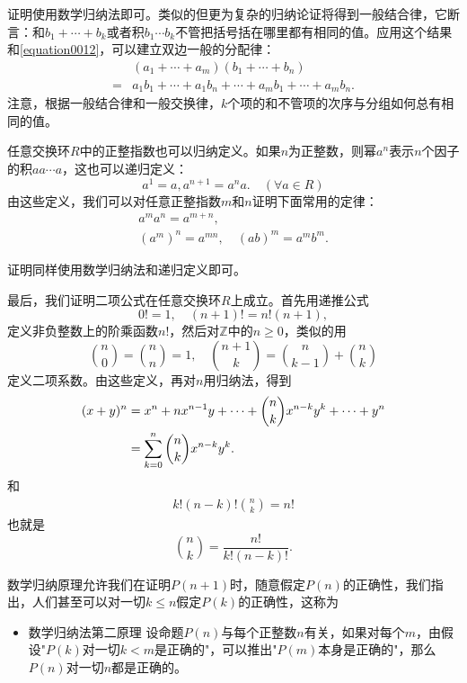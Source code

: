证明使用数学归纳法即可。类似的但更为复杂的归纳论证将得到一般结合律，它断言：和$b_1+\cdots+b_k$或者积$b_1\cdots{}b_k$不管把括号括在哪里都有相同的值。应用这个结果和\ref{equation0012}，可以建立双边一般的分配律：
\[
\begin{aligned}
&(a_1+\cdots+a_m)(b_1+\cdots+b_n)\\
=&a_1b_1+\cdots+a_1b_n+\cdots+a_mb_1+\cdots+a_mb_n.
\end{aligned}
\]
注意，根据一般结合律和一般交换律，$k$个项的和不管项的次序与分组如何总有相同的值。

任意交换环$R$中的正整指数也可以归纳定义。如果$n$为正整数，则幂$a^n$表示$n$个因子的积$aa\cdots{}a$，这也可以递归定义：
\begin{equation}\label{equation0016}
a^1 = a, a^{n+1} = a^na. \quad(\forall a \in R)
\end{equation}由这些定义，我们可以对任意正整指数$m$和$n$证明下面常用的定律：
\begin{gather}
a^ma^n=a^{m+n},\label{equation0017}\\
(a^m)^n = a^{mn},\quad (ab)^m=a^mb^m.\label{equation0018}
\end{gather}

证明同样使用数学归纳法和递归定义即可。

最后，我们证明二项公式在任意交换环$R$上成立。首先用递推公式
\[
0!=1,\quad (n+1)!=n!(n+1),
\]
定义非负整数上的阶乘函数$n!$，然后对$\mathbb{Z}$中的$n \ge 0$，类似的用
\[
\binom{n}{0} = \binom{n}{n}=1, \quad \binom{n+1}{k} = \binom{n}{k-1} + \binom{n}{k} 
\]
定义二项系数。由这些定义，再对$n$用归纳法，得到 %
\begin{align}\label{equation0019}
(x+y)^n &= x^n + nx^{n-1}y + \cdots + \binom{n}{k}x^{n-k}y^k + \cdots + y^n \notag \\
&=\sum_{k=0}^{n}{\binom{n}{k}x^{n-k}y^k}.
\end{align}
和
\begin{gather}\label{equation0020}
k!(n-k)!\binom{n}{k}=n!
\end{gather}
也就是
\[
{n \choose k} = \frac{n!}{k!(n-k)!}.
\]

数学归纳原理允许我们在证明$P(n+1)$时，随意假定$P(n)$的正确性，我们指出，人们甚至可以对一切$k \le n$假定$P(k)$的正确性，这称为
\begin{itemize}
\item \textcolor{main}{数学归纳法第二原理} 设命题$P(n)$与每个正整数$n$有关，如果对每个$m$，由假设"$P(k)$对一切$k <m$是正确的"，可以推出"$P(m)$本身是正确的"，那么$P(n)$对一切$n$都是正确的。
\end{itemize}

